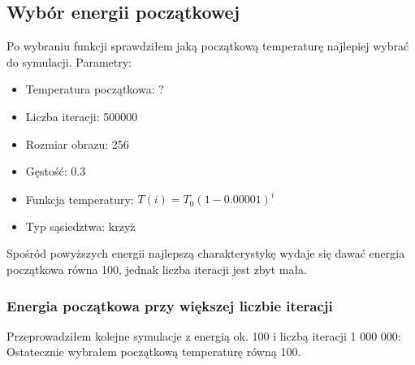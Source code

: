 \subsection{Wybór energii początkowej}
Po wybraniu funkcji sprawdziłem jaką początkową temperaturę najlepiej wybrać do symulacji.
Parametry:
\begin{itemize}
    \item Temperatura początkowa: ?
    \item Liczba iteracji: 500000
    \item Rozmiar obrazu: 256
    \item Gęstość: 0.3
    \item Funkcja temperatury: $T(i) = T_0(1-0.00001)^{i}$
    \item Typ sąsiedztwa: krzyż 
\end{itemize}

Spośród powyższych energii najlepszą charakterystykę wydaje się dawać energia początkowa równa 100, jednak liczba iteracji jest zbyt mała.

\subsubsection{Energia początkowa przy większej liczbie iteracji}
Przeprowadziłem kolejne symulacje z energią ok. 100 i liczbą iteracji 1 000 000:\\
Ostatecznie wybrałem początkową temperaturę równą 100.



